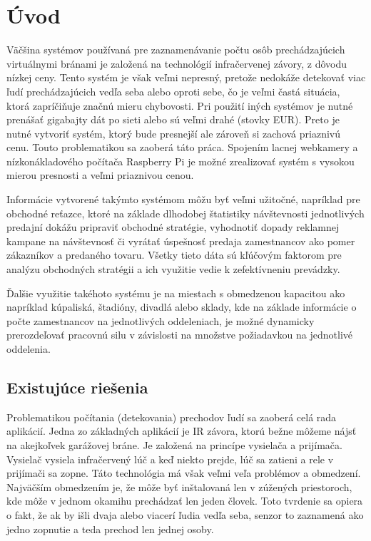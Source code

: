 
\chapter{Úvod}
Väčšina systémov používaná pre zaznamenávanie počtu osôb prechádzajúcich virtuálnymi bránami  je založená na technológií infračervenej závory, z dôvodu nízkej ceny. Tento systém je však veľmi nepresný, pretože nedokáže detekovať viac ľudí prechádzajúcich vedľa seba alebo oproti sebe, čo je veľmi častá situácia, ktorá zapríčiňuje značnú mieru chybovosti. Pri použití iných systémov je nutné prenášať gigabajty dát po sieti alebo sú veľmi drahé (stovky EUR). Preto je nutné vytvoriť systém, ktorý bude presnejší ale zároveň si zachová priaznivú cenu. Touto problematikou sa zaoberá táto práca. Spojením lacnej webkamery a nízkonákladového počítača Raspberry Pi je možné zrealizovať systém s vysokou mierou presnosti a veľmi priaznivou cenou.
    
Informácie vytvorené takýmto systémom môžu byť veľmi užitočné, napríklad pre obchodné reťazce, ktoré na základe dlhodobej štatistiky návštevnosti jednotlivých predajní dokážu pripraviť obchodné stratégie, vyhodnotiť dopady reklamnej kampane na návštevnosť či vyrátať úspešnosť predaja zamestnancov ako pomer zákazníkov a predaného tovaru. Všetky tieto dáta sú kľúčovým faktorom pre analýzu obchodných stratégii a ich využitie vedie k zefektívneniu prevádzky.
    
Ďalšie využitie takéhoto systému je na miestach s obmedzenou kapacitou ako napríklad kúpaliská, štadióny, divadlá alebo sklady, kde na základe informácie o počte zamestnancov na jednotlivých oddeleniach, je možné dynamicky prerozdeľovať pracovnú silu v závislosti na množstve požiadavkou na jednotlivé oddelenia. 



\section{Existujúce riešenia}
Problematikou počítania (detekovania) prechodov ľudí sa zaoberá celá rada aplikácií.  
Jedna zo základných aplikácií je IR závora, ktorú bežne môžeme nájsť na akejkoľvek garážovej bráne. Je založená na princípe vysielača a prijímača. Vysielač vysiela infračervený lúč a keď niekto prejde, lúč sa zatieni a rele v prijímači sa zopne. Táto technológia má však veľmi veľa problémov a obmedzení. Najväčším obmedzením je, že môže byť inštalovaná len v zúžených priestoroch, kde môže v jednom okamihu prechádzať len jeden človek. Toto tvrdenie sa opiera o fakt, že ak by išli dvaja alebo viacerí ľudia vedľa seba, senzor to zaznamená ako jedno zopnutie a teda prechod len jednej osoby.

